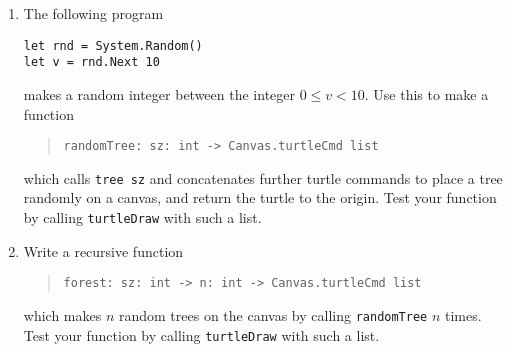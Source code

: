 \begin{enumerate}
\item The following program
\begin{lstlisting}
let rnd = System.Random()
let v = rnd.Next 10
\end{lstlisting}
makes a random integer between the integer $0\leq v < 10$. Use this to make a function
\begin{quote}
  \lstinline{randomTree: sz: int -> Canvas.turtleCmd list}
\end{quote}
which calls \lstinline{tree sz} and concatenates further turtle commands to place a tree randomly on a canvas, and return the turtle to the origin. Test your function by calling \lstinline{turtleDraw} with such a list.
\item Write a recursive function
\begin{quote}
  \lstinline{forest: sz: int -> n: int -> Canvas.turtleCmd list}
\end{quote}
which makes $n$ random trees on the canvas by calling \lstinline{randomTree} $n$ times. Test your function by calling \lstinline{turtleDraw} with such a list.
\end{enumerate}
